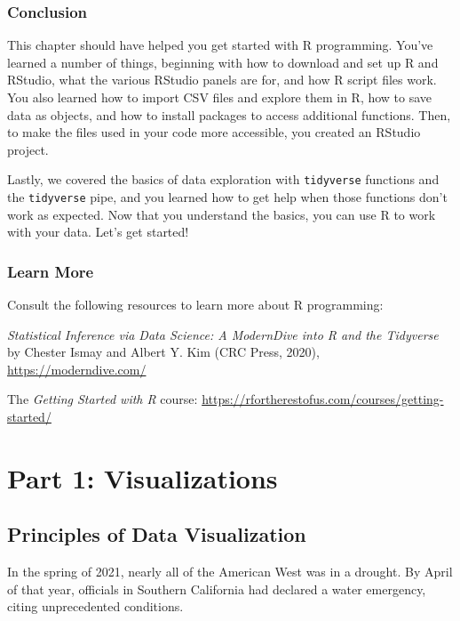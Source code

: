 \documentclass[
]{book}
\begin{document}
\hypertarget{conclusion}{%
\section*{Conclusion}\label{conclusion}}

This chapter should have helped you get started with R programming. You've learned a number of things, beginning with how to download and set up R and RStudio, what the various RStudio panels are for, and how R script files work. You also learned how to import CSV files and explore them in R, how to save data as objects, and how to install packages to access additional functions. Then, to make the files used in your code more accessible, you created an RStudio project.

Lastly, we covered the basics of data exploration with \texttt{tidyverse} functions and the \texttt{tidyverse} pipe, and you learned how to get help when those functions don't work as expected. Now that you understand the basics, you can use R to work with your data. Let's get started!

\hypertarget{learn-more}{%
\section*{Learn More}\label{learn-more}}

Consult the following resources to learn more about R programming:

\emph{Statistical Inference via Data Science: A ModernDive into R and the Tidyverse} by Chester Ismay and Albert Y. Kim (CRC Press, 2020), \url{https://moderndive.com/}

The \emph{Getting Started with R} course: \url{https://rfortherestofus.com/courses/getting-started/}

\hypertarget{part-part-1-visualizations}{%
\part*{Part 1: Visualizations}\label{part-part-1-visualizations}}

\hypertarget{data-viz-chapter}{%
\chapter{Principles of Data Visualization}\label{data-viz-chapter}}

In the spring of 2021, nearly all of the American West was in a drought. By April of that year, officials in Southern California had declared a water emergency, citing unprecedented conditions.
\end{document}
